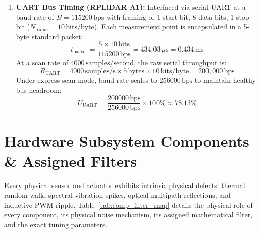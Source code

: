 \documentclass[11pt, a4paper]{article}
\begin{document}
\begin{enumerate}
\begin{align}
    \end{align}
    The minimum pull-up resistance to limit drive current below $I_{OL} = 3\,\text{mA}$ at $V_{OL} = 0.4\,\text{V}$ under $V_{DD} = 3.3\,\text{V}$:
    \begin{align}
        R_{p, \min} &= \frac{V_{DD} - V_{OL}}{I_{OL}} = \frac{3.3\,\text{V} - 0.4\,\text{V}}{3.0 \times 10^{-3}\,\text{A}} \nonumber \\
        &= \frac{2.9\,\text{V}}{0.003\,\text{A}} = 966.7\,\Omega \implies \mathbf{1.0\,\text{k}\Omega}
    \end{align}
    Thus, choosing standard pull-up resistors $R_p = 2.2\,\text{k}\Omega$ guarantees sharp digital transitions without bus driver overload.
    \item \textbf{UART Bus Timing (RPLiDAR A1):} Interfaced via serial UART at a baud rate of $B = 115200\,\text{bps}$ with framing of 1 start bit, 8 data bits, 1 stop bit ($N_{\text{frame}} = 10\,\text{bits/byte}$). Each measurement point is encapsulated in a 5-byte standard packet:
    \begin{equation}
        t_{\text{packet}} = \frac{5 \times 10\,\text{bits}}{115200\,\text{bps}} = 434.03\,\mu\text{s} = 0.434\,\text{ms}
    \end{equation}
    At a scan rate of $4000\,\text{samples/second}$, the raw serial throughput is:
    \begin{equation}
        R_{\text{UART}} = 4000\,\text{samples/s} \times 5\,\text{bytes} \times 10\,\text{bits/byte} = 200,000\,\text{bps}
    \end{equation}
    Under express scan mode, baud rate scales to $256000\,\text{bps}$ to maintain healthy bus headroom:
    \begin{equation}
        U_{\text{UART}} = \frac{200000\,\text{bps}}{256000\,\text{bps}} \times 100\% \approx 78.13\%
    \end{equation}
\end{enumerate}

\newpage
\section{Hardware Subsystem Components \& Assigned Filters}

Every physical sensor and actuator exhibits intrinsic physical defects: thermal random walk, spectral vibration spikes, optical multipath reflections, and inductive PWM ripple. Table~\ref{tab:comp_filter_map} details the physical role of every component, its physical noise mechanism, its assigned mathematical filter, and the exact tuning parameters.
\end{document}
